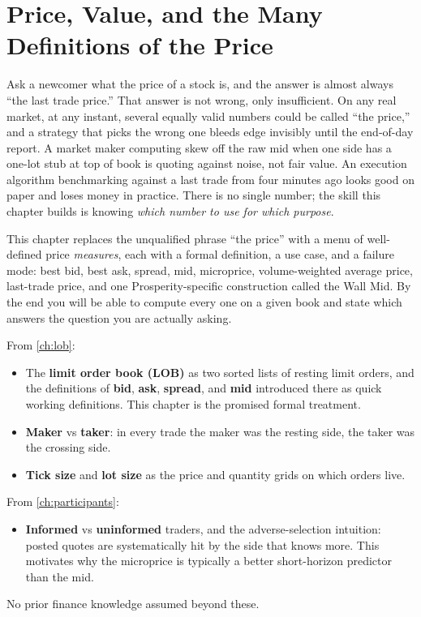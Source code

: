 \chapter{Price, Value, and the Many Definitions of the Price}
\label{ch:price_value}

Ask a newcomer what the price of a stock is, and the answer is almost
always ``the last trade price.'' That answer is not wrong, only
insufficient. On any real market, at any instant, several equally
valid numbers could be called ``the price,'' and a strategy that
picks the wrong one bleeds edge invisibly until the end-of-day
report. A market maker computing skew off the raw mid when one side
has a one-lot stub at top of book is quoting against noise, not fair
value. An execution algorithm benchmarking against a last trade from
four minutes ago looks good on paper and loses money in practice.
There is no single number; the skill this chapter builds is knowing
\emph{which number to use for which purpose}.

This chapter replaces the unqualified phrase ``the price'' with a
menu of well-defined price \emph{measures}, each with a formal
definition, a use case, and a failure mode: best bid, best ask,
spread, mid, microprice, volume-weighted average price, last-trade
price, and one Prosperity-specific construction called the Wall Mid.
By the end you will be able to compute every one on a given book and
state which answers the question you are actually asking.

\begin{backgroundbox}[Prerequisites]
From \cref{ch:lob}:
\begin{itemize}
  \item The \textbf{limit order book (LOB)} as two sorted lists of
  resting limit orders, and the definitions of \textbf{bid},
  \textbf{ask}, \textbf{spread}, and \textbf{mid} introduced there as
  quick working definitions. This chapter is the promised formal
  treatment.
  \item \textbf{Maker} vs \textbf{taker}: in every trade the maker
  was the resting side, the taker was the crossing side.
  \item \textbf{Tick size} and \textbf{lot size} as the price and
  quantity grids on which orders live.
\end{itemize}
From \cref{ch:participants}:
\begin{itemize}
  \item \textbf{Informed} vs \textbf{uninformed} traders, and the
  adverse-selection intuition: posted quotes are systematically hit
  by the side that knows more. This motivates why the microprice is
  typically a better short-horizon predictor than the mid.
\end{itemize}
No prior finance knowledge assumed beyond these.
\end{backgroundbox}

